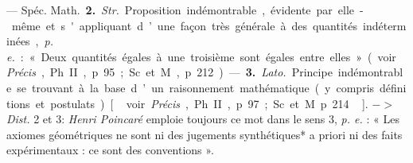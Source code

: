 \begin{itemize}[leftmargin=1cm, label=, itemsep=1pt]
— Spéc. \si{Math.} {\bf 2.} {\it Str.} Proposition indémontrable, évidente par
elle-même et s'appliquant d’une
façon très générale à des quantités
indéterminées, {\it p. e.} : « Deux quantités
égales à une troisième sont égales
entre elles » (voir {\it Précis}, Ph. II,
p. 95; Sc. et M., p. 212). — {\bf 3.} {\it Lato.}
Principe indémontrable se trouvant
à la base d’un raisonnement mathématique (y compris définitions et
postulats) [\,voir {\it Précis}, Ph. II, p. 97;
Sc. et M. p. 214\,]. $->$ {\it Dist.} 2 et 3:
{\it Henri Poincaré} emploie toujours
ce mot dans le sens 3, {\it p. e.} : « Les
axiomes géométriques ne sont ni des
jugements synthétiques* a priori ni
des faits expérimentaux : ce sont
des conventions ».
	\end{itemize}
